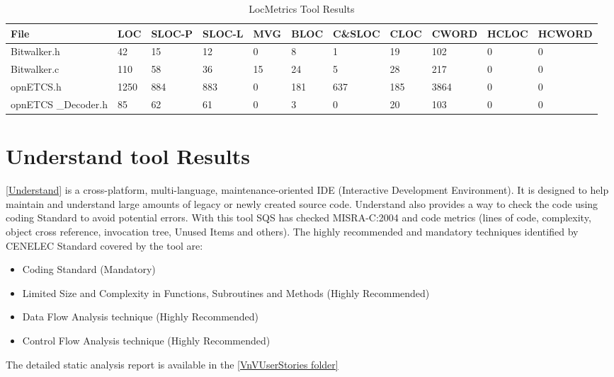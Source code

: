 \begin{longtable}{||p{}|p{}|p{}|p{}|p{}|p{}|p{}|p{}|p{}|p{}|p{}||}
  \caption{LocMetrics Tool Results}\\
    \hline\hline
    \textbf{File} & LOC &  SLOC-P & SLOC-L & MVG & BLOC & C\&SLOC & CLOC & CWORD & HCLOC & HCWORD \\
    \hline\hline
    \endhead
    \hline\hline
    \endfoot
    Bitwalker.h &
    42 & 15 & 12 & 0 & 8 & 1 & 19 & 102 & 0 & 0
    \\
    \hline
    Bitwalker.c &
    110 & 58 & 36 & 15 & 24 & 5 & 28 & 217 & 0 & 0
    \\
    \hline
    opnETCS.h &
    1250 & 884 & 883 & 0 & 181 & 637 & 185 & 3864 & 0 & 0
    \\
    \hline
    opnETCS
    \_Decoder.h &
    85 & 62 & 61 & 0 & 3 & 0 & 20 & 103 & 0 & 0
    \\
    \hline
\end{longtable}

\section{Understand tool Results}
\href{http://www.scitools.com/}{[Understand]} is a cross-platform, multi-language, maintenance-oriented IDE (Interactive Development Environment). It is designed to help maintain and understand large amounts of legacy or newly created source code. 
Understand also provides a way to check the code using coding Standard to avoid potential errors. With this tool SQS has checked MISRA-C:2004 and code metrics (lines of code, complexity, object cross reference, invocation tree, Unused Items and others). The highly recommended and mandatory techniques identified by CENELEC Standard covered by the tool are:
\begin{itemize}
\item Coding Standard (Mandatory)
\item Limited Size and Complexity in Functions, Subroutines and Methods (Highly Recommended)
\item Data Flow Analysis technique (Highly Recommended)
\item Control Flow Analysis technique (Highly Recommended)
\end{itemize}

The detailed static analysis report is available in the \href{https://github.com/openETCS/validation/tree/master/VnVUserStories/VnVUserStorySQS/04-Results}{[VnVUserStories folder]}

